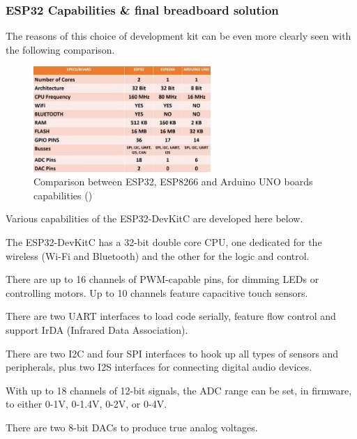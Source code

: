 \subsubsection{ESP32 Capabilities \& final breadboard solution}
\label{subsubsec:hardware/esp32_capabilities} 

The reasons of this choice of development kit can be even more clearly seen with the following comparison.

\begin{figure}[H]
    \centering
    \includegraphics[width=0.6\textwidth]{images/EE_Comparaison_ESP32_ArduinoUNO.jpg}
    \caption{Comparison between ESP32, ESP8266 and Arduino UNO boards capabilities (\cite{esp32futureelectronics})}
    \label{fig:Comparison_ESP32_ArduinoUNO}
\end{figure}

\medskip Various capabilities of the ESP32-DevKitC are developed here below.

\begin{description}[align=left]
    \item[CPU architecture] The ESP32-DevKitC has a 32-bit double core CPU, one dedicated for the wireless (Wi-Fi and Bluetooth) and the other for the logic and control.
    \item[GPIO pins] There are up to 16 channels of PWM-capable pins, for dimming LEDs or controlling motors. Up to 10 channels feature capacitive touch sensors.
    \item[UART] There are two UART interfaces to load code serially, feature flow control and support IrDA (Infrared Data Association).
    \item[I2C, SPI, I2S] There are two I2C and four SPI interfaces to hook up all types of sensors and peripherals, plus two I2S interfaces for connecting digital audio devices.
    \item[Analog-to-Digital Converter (ADC)] With up to 18 channels of 12-bit signals, the ADC range can be set, in firmware, to either 0-1V, 0-1.4V, 0-2V, or 0-4V.
    \item[Digital-to-Analog Converter (DAC)] There are two 8-bit DACs to produce true analog voltages.
\end{description}

